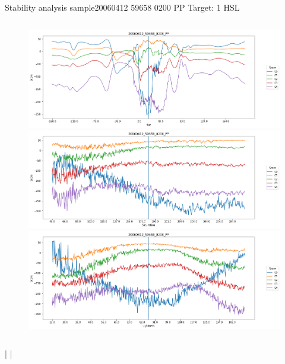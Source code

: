 \documentclass{beamer}
\begin{document}
\begin{frame}{Stability analysis sample}{20060412 59658 0200 PP Target: 1 HSL}
\begin{columns}
\begin{column}{0.45\textwidth}
\begin{figure}[p]
			\includegraphics[width=\textwidth]{chapter_stability/20060412_59658_0200_PP/h/scores.png}			\includegraphics[width=\textwidth]{chapter_stability/20060412_59658_0200_PP/s/scores.png}			\includegraphics[width=\textwidth]{chapter_stability/20060412_59658_0200_PP/l/scores.png}
		\end{figure}
	\end{column}
\end{columns}
\href{run:videos_stability/Messidor_20060412_59658_0200_PP_Target_1_Checking_Hue_Sensitivity.mp4}{\color{blue}{Hue}} | \href{run:videos_stability/Messidor_20060412_59658_0200_PP_Target_1_Checking_Saturation_Sensitivity.mp4}{\color{blue}{Saturation}} | \href{run:videos_stability/Messidor_20060412_59658_0200_PP_Target_1_Checking_Luminance_Sensitivity.mp4}{\color{blue}{Lightness}}
\end{frame}
\end{document}
